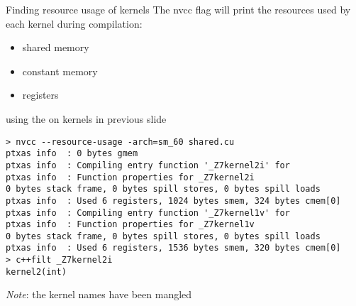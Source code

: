 \documentclass[aspectratio=43]{beamer}
\begin{document}
\begin{frame}[fragile]{Finding resource usage of kernels}
    The nvcc flag  will print the resources used by each kernel during compilation:
    \begin{itemize}
        \item shared memory
        \item constant memory
        \item registers
    \end{itemize}

    \begin{terminal}{using the  on kernels in previous slide}
    \begin{lstlisting}[style=terminal]
> nvcc --resource-usage -arch=sm_60 shared.cu 
ptxas info  : 0 bytes gmem
ptxas info  : Compiling entry function '_Z7kernel2i' for
ptxas info  : Function properties for _Z7kernel2i
0 bytes stack frame, 0 bytes spill stores, 0 bytes spill loads
ptxas info  : Used 6 registers, 1024 bytes smem, 324 bytes cmem[0]
ptxas info  : Compiling entry function '_Z7kernel1v' for
ptxas info  : Function properties for _Z7kernel1v
0 bytes stack frame, 0 bytes spill stores, 0 bytes spill loads
ptxas info  : Used 6 registers, 1536 bytes smem, 320 bytes cmem[0]
> c++filt _Z7kernel2i
kernel2(int)
    \end{lstlisting}
    \end{terminal}
    \emph{Note}: the kernel names have been mangled

\end{frame}
\end{document}
